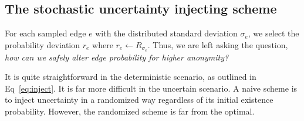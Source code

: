 \subsection{The stochastic uncertainty injecting scheme}
For each sampled edge $e$ with the distributed standard deviation $\sigma_{e}$, we select the probability deviation $r_{e}$ where $r_{e} \leftarrow R_{\sigma_{e}}$. Thus, we are left asking the question, \emph{how can we safely alter edge probability for higher anonymity?}


It is quite straightforward in the deterministic scenario, as outlined in Eq~\ref{eq:inject}. It is far more difficult in the uncertain scenario. A naive scheme is to inject uncertainty in a randomized way regardless of its initial existence probability. However, the randomized scheme is far from the optimal. 
